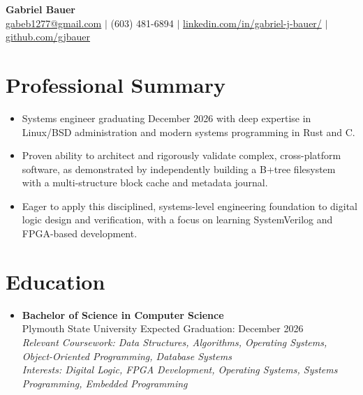 \documentclass[11pt]{article}
\begin{document}
\begin{center}
    {\LARGE \textbf{Gabriel Bauer}} \\
    \vspace{0.1in}
    \href{mailto:gabeb1277@gmail.com}{gabeb1277@gmail.com} $\vert$ 
    (603) 481-6894 $\vert$ 
    \href{https://www.linkedin.com/in/gabriel-j-bauer/}{linkedin.com/in/gabriel-j-bauer/} $\vert$
    \href{https://github.com/gjbauer}{github.com/gjbauer}
\end{center}

\section*{Professional Summary}
\vspace{-0.1in}
\begin{itemize}[leftmargin=*, itemsep=0pt]
    \item Systems engineer graduating December 2026 with deep expertise in Linux/BSD administration and modern systems programming in Rust and C.
    \item Proven ability to architect and rigorously validate complex, cross-platform software, as demonstrated by independently building a B+tree filesystem with a multi-structure block cache and metadata journal.
    \item Eager to apply this disciplined, systems-level engineering foundation to digital logic design and verification, with a focus on learning SystemVerilog and FPGA-based development.
\end{itemize}

\section*{Education}
\vspace{-0.1in}
\begin{itemize}[leftmargin=*]
    \item \textbf{Bachelor of Science in Computer Science} \\
    Plymouth State University \hfill Expected Graduation: December 2026 \\
    \textit{Relevant Coursework: Data Structures, Algorithms, Operating Systems, Object-Oriented Programming, Database Systems} \\
    \textit{Interests: Digital Logic, FPGA Development, Operating Systems, Systems Programming, Embedded Programming}
\end{itemize}
\end{document}
